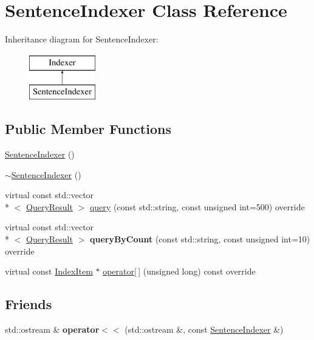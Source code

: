 \hypertarget{classSentenceIndexer}{\section{Sentence\-Indexer Class Reference}
\label{classSentenceIndexer}
}
Inheritance diagram for Sentence\-Indexer\-:\begin{figure}[H]
\begin{center}
\leavevmode
\includegraphics[height=2.000000cm]{classSentenceIndexer}
\end{center}
\end{figure}
\subsection*{Public Member Functions}
\begin{DoxyCompactItemize}
\item 
\hyperlink{classSentenceIndexer_a2ec9f359954191ebc5d84c759fd2238d}{Sentence\-Indexer} ()
\item 
\hyperlink{classSentenceIndexer_a3402eb910551128d0c8ecb33cf0bae42}{$\sim$\-Sentence\-Indexer} ()
\item 
virtual const std\-::vector\\*
$<$ \hyperlink{classQueryResult}{Query\-Result} $>$ \hyperlink{classSentenceIndexer_ac9b17bde40b851d8e0c263ce2241b9c4}{query} (const std\-::string, const unsigned int=500) override
\item 
\hypertarget{classSentenceIndexer_ad136814c8e5fc13c05a35cff6c15506b}{virtual const std\-::vector\\*
$<$ \hyperlink{classQueryResult}{Query\-Result} $>$ {\bfseries query\-By\-Count} (const std\-::string, const unsigned int=10) override}\label{classSentenceIndexer_ad136814c8e5fc13c05a35cff6c15506b}

\item 
virtual const \hyperlink{classIndexItem}{Index\-Item} $\ast$ \hyperlink{classSentenceIndexer_ae2822279343f3957edabf9cd3c1ef254}{operator\mbox{[}$\,$\mbox{]}} (unsigned long) const override
\end{DoxyCompactItemize}
\subsection*{Friends}
\begin{DoxyCompactItemize}
\item 
\hypertarget{classSentenceIndexer_a28ba47a4a3b51dc012fa2f8fb194ab22}{std\-::ostream \& {\bfseries operator$<$$<$} (std\-::ostream \&, const \hyperlink{classSentenceIndexer}{Sentence\-Indexer} \&)}\label{classSentenceIndexer_a28ba47a4a3b51dc012fa2f8fb194ab22}

\end{DoxyCompactItemize}
